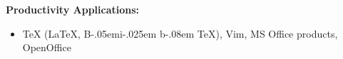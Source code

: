 \documentclass[10pt]{article}
\renewcommand{\section}[1]{\pagebreak[3]%
    \hyphenpenalty=10000%
    \vspace{1.3\baselineskip}%
    \phantomsection\addcontentsline{toc}{section}{#1}%
    \noindent\llap{\scshape\smash{\parbox[t]{\marginparwidth}{\raggedright \textbf{#1}}}}%
    \vspace{-\baselineskip}\par}
\newenvironment{innerlist}[1][\enskip\textbullet]%
        {\begin{itemize}[#1,leftmargin=*,parsep=0pt,itemsep=0pt,topsep=0pt,partopsep=0pt]}
        {\end{itemize}}
\newcommand{\halfblankline}{\quad\vspace{-0.5\baselineskip}\pagebreak[3]}
\providecommand\BibTeX{{B\kern-.05em{\sc i\kern-.025em b}\kern-.08em
    \TeX}}
\begin{document}
\textbf{Productivity Applications:}
%
\begin{innerlist}
    \item \TeX{} (\LaTeX{}, \BibTeX{}), Vim, MS Office products, OpenOffice
\end{innerlist}


%




%
\end{document}
